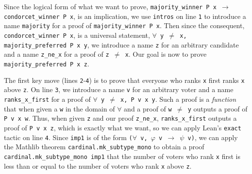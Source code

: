 \documentclass[runningheads]{llncs}
\begin{document}
Since the logical form of what we want to prove, \texttt{majority\_winner P x $\to$ condorcet\_winner P x}, is an implication, we use \texttt{intros} on line \texttt{1} to introduce a name \texttt{majority} for a proof of \texttt{majority\_winner P x}. Then since the consequent, \texttt{condorcet\_winner P x}, is a universal statement, \texttt{$\forall$ y $\neq$ x, majority\_preferred  P x~y}, we introduce a name \texttt{z} for an arbitrary candidate and a name \texttt{z\_ne\_x} for a proof of \texttt{z $\neq$ x}. Our goal is now to prove \texttt{majority\_preferred P x z}. %

The first key move (lines \texttt{2}-\texttt{4}) is to prove that everyone who ranks \texttt{x} first ranks \texttt{x} above \texttt{z}. On line \texttt{3}, we introduce a name \texttt{v} for an arbitrary voter and a name \texttt{ranks\_x\_first} for a proof of  \texttt{$\forall$ y $\neq$ x, P v x y}. Such a proof is a \textit{function} that when given a \texttt{w} in the domain of $\forall$ and a proof of \texttt{w $\neq$ y} outputs a proof of \texttt{P~v~x~w}. Thus, when given \texttt{z} and our proof \texttt{z\_ne\_x},  \texttt{ranks\_x\_first} outputs a proof of \texttt{P v x z}, which is exactly what we want, so we can apply Lean's \texttt{exact} tactic on line \texttt{4}. Since \texttt{imp1} is of the form \texttt{($\forall$ v, $\varphi$ v $\to$ $\psi$ v)}, we can apply the Mathlib theorem \texttt{cardinal.mk\_subtype\_mono} to obtain a proof \texttt{cardinal.mk\_subtype\_mono imp1} that the number of voters who rank \texttt{x} first is less than or equal to the number of voters who rank \texttt{x} above \texttt{z}.%
\end{document}
